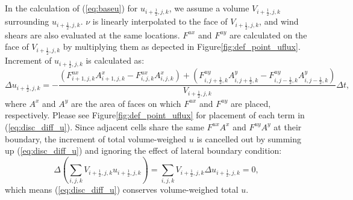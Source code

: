 \documentclass[9pt]{jsarticle}
\begin{document}
\newpage
\vspace{-10pt}
In the calculation of (\ref{eq:baseu}) for $u_{i+\frac{1}{2},j,k}$, we assume a volume $V_{i+\frac{1}{2},j,k}$ surrounding $u_{i+\frac{1}{2},j,k}$.
$\nu$ is linearly interpolated to the face of $V_{i+\frac{1}{2},j,k}$, and wind shears are also evaluated at the same locations.
$F^{ux}$ and $F^{uy}$ are calculated on the face of $V_{i+\frac{1}{2},j,k}$ by multiplying them as depected in Figure\ref{fig:def_point_uflux}.
Increment of $u_{i+\frac{1}{2},j,k}$ is calculated as:
\vspace{-5pt}
\begin{equation}
  \Delta u_{i+\frac{1}{2},j,k} = - \frac{
        \left( F^{ux}_{i+1,j,k} A^{x}_{i+1,j,k} - F^{ux}_{i,j,k} A^{x}_{i,j,k} \right)
      + \left( F^{uy}_{i,j+\frac{1}{2},k} A^{y}_{i,j+\frac{1}{2},k} - F^{uy}_{i,j-\frac{1}{2},k} A^{y}_{i,j-\frac{1}{2},k} \right)
                                        }{ V_{i+\frac{1}{2},j,k} } \Delta t,
  \label{eq:disc_diff_u}
\end{equation}
where $A^{x}$ and $A^{y}$ are the area of faces on which $F^{ux}$ and $F^{uy}$ are placed, respectively.
Please see Figure\ref{fig:def_point_uflux} for placement of each term in (\ref{eq:disc_diff_u}).
Since adjacent cells share the same $F^{ux} A^{x}$ and $F^{uy} A^{y}$ at their boundary, the increment of total volume-weighed $u$ is cancelled out by summing up (\ref{eq:disc_diff_u}) and ignoring the effect of lateral boundary condition:
\vspace{-5pt}
\begin{equation}
  \Delta \left( \sum_{i,j,k} V_{i+\frac{1}{2},j,k} u_{i+\frac{1}{2},j,k} \right) = \sum_{i,j,k} V_{i+\frac{1}{2},j,k} \Delta u_{i+\frac{1}{2},j,k} = 0,
\end{equation}
which means (\ref{eq:disc_diff_u}) conserves volume-weighed total $u$.
\end{document}
